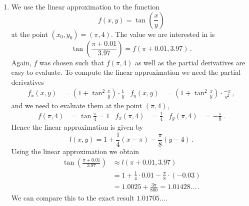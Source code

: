 \begin{solution}
\begin{enumerate}
\item
We use the linear approximation to the function
\[
f(x,y) = \tan \left( \frac {x}{y} \right)
\]
at the point $(x_0,y_0) = (\pi, 4)$. The value we are interested in is 
\[
\tan \left(\displaystyle\frac{\pi + 0.01}{3.97}\right) = f(\pi+0.01, 3.97)\,.
\]
Again, $f$ was chosen such that $f(\pi, 4)$ as well as the partial derivatives are easy to evaluate. To compute the linear approximation we need the partial derivatives
\begin{align*}
f_x(x,y) &= \left(1 + \tan^2\frac{x}{y}\right) \cdot \frac{1}{y} &
f_y(x,y) &= \left(1 + \tan^2\frac{x}{y}\right) \cdot \frac{-x}{y^2} \,,
\end{align*}
and we need to evaluate them at the point $(\pi, 4)$,
\begin{align*}
f(\pi, 4)&= \tan \frac \pi 4 = 1 &
f_x(\pi, 4) &=  \frac 14 &
f_y(\pi, 4) &= -\frac \pi{8}\,.
\end{align*}
Hence the linear approximation is given by
\[
l(x,y) = 1 + \frac 14 (x - \pi) - \frac \pi{8}(y-4)\,.
\]
Using the linear approximation we obtain
\begin{align*}
\tan \left(\displaystyle\frac{\pi + 0.01}{3.97}\right) &\approx l(\pi+0.01, 3.97)\\
&= 1+\frac 14 \cdot 0.01 - \frac \pi{8} \cdot (-0.03)                         \\
&= 1.0025 + \frac{3\pi}{800} = 1.01428\dots\,.
\end{align*}
We can compare this to the exact result $1.01705\dots$.
\end{enumerate}
\end{solution}

